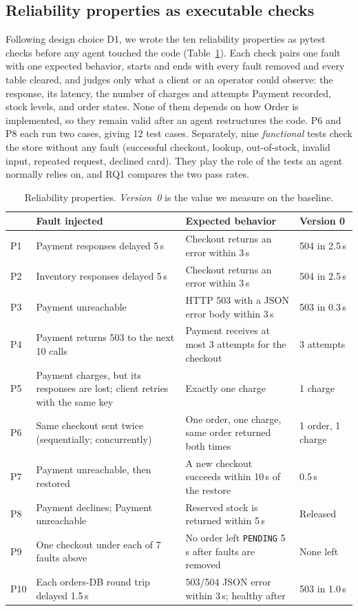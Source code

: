 \subsection{Reliability properties as executable checks}
\label{sec:props}

Following design choice D1, we wrote the ten reliability properties as pytest checks before any
agent touched the code (Table~\ref{tab:props}). Each check pairs one fault with one expected
behavior, starts and ends with every fault removed and every table cleared, and judges only what
a client or an operator could observe: the response, its latency, the number of charges and
attempts Payment recorded, stock levels, and order states. None of them depends on how Order is
implemented, so they remain valid after an agent restructures the code. P6 and P8 each run two
cases, giving 12 test cases. Separately, nine \emph{functional} tests check the store without
any fault (successful checkout, lookup, out-of-stock, invalid input, repeated request, declined
card). They play the role of the tests an agent normally relies on, and RQ1 compares the two pass
rates.

\begin{table}[t]
  \caption{Reliability properties. \emph{Version~0} is the value we measure on the baseline.}
  \label{tab:props}
  \small
  \begin{tabular}{@{}l p{5.4cm} p{6.6cm} l@{}}
    \toprule
    & Fault injected & Expected behavior & Version 0 \\
    \midrule
    P1  & Payment responses delayed 5\,s & Checkout returns an error within 3\,s & 504 in 2.5\,s \\
    P2  & Inventory responses delayed 5\,s & Checkout returns an error within 3\,s & 504 in 2.5\,s \\
    P3  & Payment unreachable & HTTP 503 with a JSON error body within 3\,s & 503 in 0.3\,s \\
    P4  & Payment returns 503 to the next 10 calls & Payment receives at most 3 attempts for the checkout & 3 attempts \\
    P5  & Payment charges, but its responses are lost; client retries with the same key & Exactly one charge & 1 charge \\
    P6  & Same checkout sent twice (sequentially; concurrently) & One order, one charge, same order returned both times & 1 order, 1 charge \\
    P7  & Payment unreachable, then restored & A new checkout succeeds within 10\,s of the restore & 0.5\,s \\
    P8  & Payment declines; Payment unreachable & Reserved stock is returned within 5\,s & Released \\
    P9  & One checkout under each of 7 faults above & No order left \texttt{PENDING} 5\,s after faults are removed & None left \\
    P10 & Each orders-DB round trip delayed 1.5\,s & 503/504 JSON error within 3\,s; healthy after & 503 in 1.0\,s \\
    \bottomrule
  \end{tabular}
\end{table}

